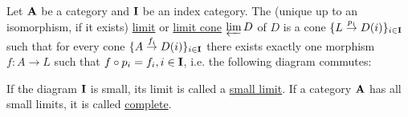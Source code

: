 \begin{definition}\label{def:categorical_limit}\cite[definitions 5.1.19(b), definition 6.3.6]{Leinster2014}
  Let $\operatorname{\mathbf{A}}$ be a category and $\operatorname{\mathbf{I}}$ be an index category. The (unique up to an isomorphism, if it exists) \uline{limit} or \uline{limit cone} $\varprojlim D$ of $D$ is a cone $\{ L \overset {p_i} \to D(i) \}_{i \in \operatorname{\mathbf{I}}}$ such that for every cone $\{ A \overset {f_i} \to D(i) \}_{i \in \operatorname{\mathbf{I}}}$ there exists exactly one morphism $f: A \to L$ such that $f \circ p_i = f_i, i \in \operatorname{\mathbf{I}}$, i.e. the following diagram commutes:
  \begin{center}
  \end{center}

  If the diagram $\operatorname{\mathbf{I}}$ is small, its limit is called a \uline{small limit}. If a category $\operatorname{\mathbf{A}}$ has all small limits, it is called \uline{complete}.
\end{definition}

